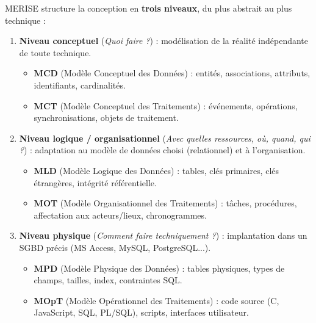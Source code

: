 \documentclass[11pt]{article}
\begin{document}
\begin{methode}
MERISE structure la conception en \textbf{trois niveaux}, du plus abstrait au plus technique :
\begin{enumerate}
\item \textbf{Niveau conceptuel} (\emph{Quoi faire ?}) : modélisation de la réalité indépendante de toute technique.
      \begin{itemize}
      \item \textbf{MCD} (Modèle Conceptuel des Données) : entités, associations, attributs, identifiants, cardinalités.
      \item \textbf{MCT} (Modèle Conceptuel des Traitements) : événements, opérations, synchronisations, objets de traitement.
      \end{itemize}
\item \textbf{Niveau logique / organisationnel} (\emph{Avec quelles ressources, où, quand, qui ?}) : adaptation au modèle de données choisi (relationnel) et à l'organisation.
      \begin{itemize}
      \item \textbf{MLD} (Modèle Logique des Données) : tables, clés primaires, clés étrangères, intégrité référentielle.
      \item \textbf{MOT} (Modèle Organisationnel des Traitements) : tâches, procédures, affectation aux acteurs/lieux, chronogrammes.
      \end{itemize}
\item \textbf{Niveau physique} (\emph{Comment faire techniquement ?}) : implantation dans un SGBD précis (MS Access, MySQL, PostgreSQL...).
      \begin{itemize}
      \item \textbf{MPD} (Modèle Physique des Données) : tables physiques, types de champs, tailles, index, contraintes SQL.
      \item \textbf{MOpT} (Modèle Opérationnel des Traitements) : code source (C, JavaScript, SQL, PL/SQL), scripts, interfaces utilisateur.
      \end{itemize}
\end{enumerate}
\end{methode}
\end{document}
